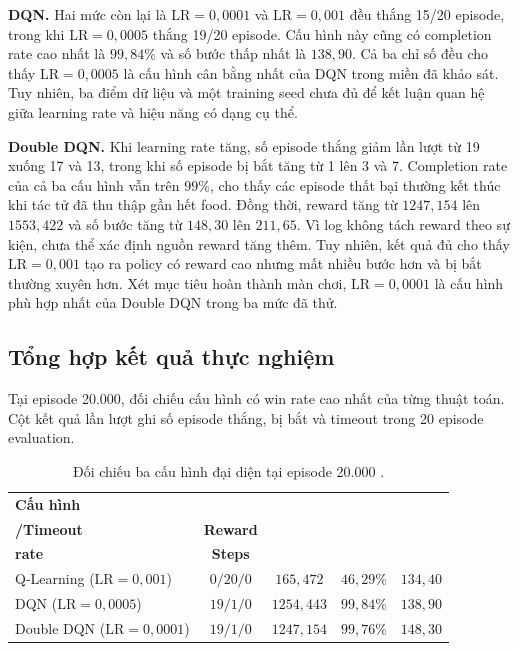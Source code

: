 \noindent\textbf{DQN.} Hai mức còn lại là $\mathrm{LR}=0{,}0001$ và $\mathrm{LR}=0{,}001$ đều thắng 15/20 episode, trong khi $\mathrm{LR}=0{,}0005$ thắng 19/20 episode. Cấu hình này cũng có completion rate cao nhất là $99{,}84\%$ và số bước thấp nhất là $138{,}90$. Cả ba chỉ số đều cho thấy $\mathrm{LR}=0{,}0005$ là cấu hình cân bằng nhất của DQN trong miền đã khảo sát. Tuy nhiên, ba điểm dữ liệu và một training seed chưa đủ để kết luận quan hệ giữa learning rate và hiệu năng có dạng cụ thể.

\noindent\textbf{Double DQN.} Khi learning rate tăng, số episode thắng giảm lần lượt từ 19 xuống 17 và 13, trong khi số episode bị bắt tăng từ 1 lên 3 và 7. Completion rate của cả ba cấu hình vẫn trên $99\%$, cho thấy các episode thất bại thường kết thúc khi tác tử đã thu thập gần hết food. Đồng thời, reward tăng từ $1247{,}154$ lên $1553{,}422$ và số bước tăng từ $148{,}30$ lên $211{,}65$. Vì log không tách reward theo sự kiện, chưa thể xác định nguồn reward tăng thêm. Tuy nhiên, kết quả đủ cho thấy $\mathrm{LR}=0{,}001$ tạo ra policy có reward cao nhưng mất nhiều bước hơn và bị bắt thường xuyên hơn. Xét mục tiêu hoàn thành màn chơi, $\mathrm{LR}=0{,}0001$ là cấu hình phù hợp nhất của Double DQN trong ba mức đã thử.

\subsection{Tổng hợp kết quả thực nghiệm}

Tại episode 20.000,  đối chiếu cấu hình có win rate cao nhất của từng thuật toán. Cột kết quả lần lượt ghi số episode thắng, bị bắt và timeout trong 20 episode evaluation.

\begin{table}[H]
    \centering
    \renewcommand{\arraystretch}{1.2}
    \setlength{\tabcolsep}{5pt}
    \footnotesize
    \begin{tabular}{lcccc}
        \toprule
        \textbf{Cấu hình} & \makecell{\textbf{Thắng/Bị bắt}\\\textbf{/Timeout}} & \textbf{Reward} & \makecell{\textbf{Completion}\\\textbf{rate}} & \textbf{Steps} \\
        \midrule
        Q-Learning ($\mathrm{LR}=0{,}001$) & $0/20/0$ & $165{,}472$ & $46{,}29\%$ & $134{,}40$ \\
        DQN ($\mathrm{LR}=0{,}0005$) & $19/1/0$ & $1254{,}443$ & $99{,}84\%$ & $138{,}90$ \\
        Double DQN ($\mathrm{LR}=0{,}0001$) & $19/1/0$ & $1247{,}154$ & $99{,}76\%$ & $148{,}30$ \\
        \bottomrule
    \end{tabular}
    \caption{Đối chiếu ba cấu hình đại diện tại episode 20.000 \cite{DRLPacmanGitHub}.}
    \label{tab:representative-comparison}
\end{table}

